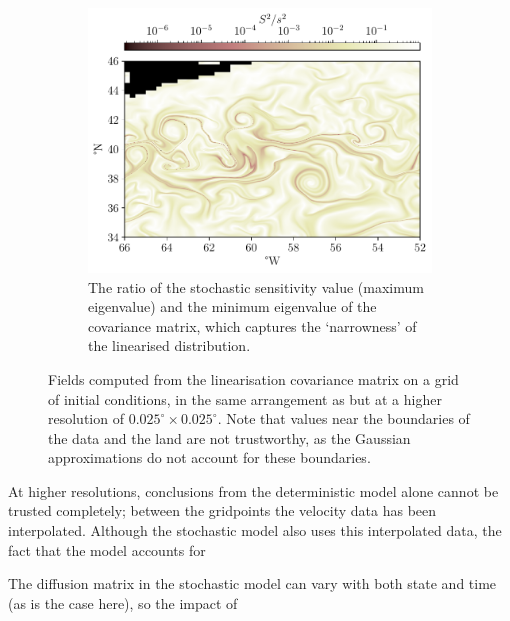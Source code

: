 \begin{figure}
\begin{center}
\begin{subfigure}[t]{0.49\textwidth}
			\includegraphics[width=\textwidth]{chp06_applications/figures/gulf_stream/ratio_field_high}
			\caption{The ratio of the stochastic sensitivity value (maximum eigenvalue) and the minimum eigenvalue of the covariance matrix, which captures the `narrowness' of the linearised distribution.}
		\end{subfigure}
		\caption{Fields computed from the linearisation covariance matrix on a grid of initial conditions, in the same arrangement as  but at a higher resolution of \(0.025^\circ \times 0.025^\circ\).
			Note that values near the boundaries of the data and the land are not trustworthy, as the Gaussian approximations do not account for these boundaries.}
		\label{fig:na_s2_high}
	\end{center}
\end{figure}


At higher resolutions, conclusions from the deterministic model alone cannot be trusted completely; between the gridpoints the velocity data has been interpolated.
Although the stochastic model also uses this interpolated data, the fact that the model accounts for


The diffusion matrix in the stochastic model can vary with both state and time (as is the case here), so the impact of



